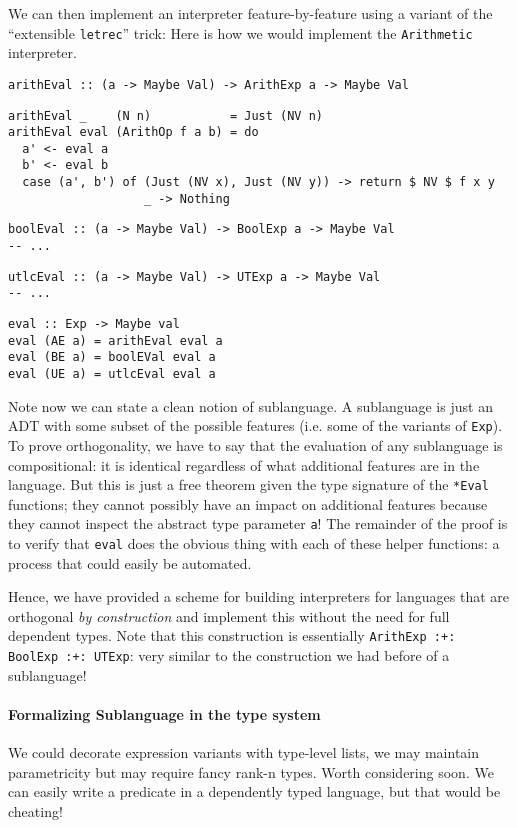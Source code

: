 \documentclass[12pt]{article}
\begin{document}
We can then implement an interpreter feature-by-feature using a variant of the ``extensible
\verb|letrec|'' trick: Here is how we would implement the \texttt{Arithmetic} interpreter.

\begin{verbatim}
arithEval :: (a -> Maybe Val) -> ArithExp a -> Maybe Val
\end{verbatim}
\begin{verbatim}
arithEval _    (N n)           = Just (NV n)
arithEval eval (ArithOp f a b) = do 
  a' <- eval a
  b' <- eval b
  case (a', b') of (Just (NV x), Just (NV y)) -> return $ NV $ f x y
                   _ -> Nothing
\end{verbatim}
\begin{verbatim}
boolEval :: (a -> Maybe Val) -> BoolExp a -> Maybe Val
-- ...
\end{verbatim}
\begin{verbatim}
utlcEval :: (a -> Maybe Val) -> UTExp a -> Maybe Val
-- ...
\end{verbatim}
\begin{verbatim}
eval :: Exp -> Maybe val
eval (AE a) = arithEval eval a
eval (BE a) = boolEVal eval a
eval (UE a) = utlcEval eval a
\end{verbatim}

Note now we can state a clean notion of sublanguage. A sublanguage is just an
ADT with some subset of the possible features (i.e. some of the variants of
\texttt{Exp}). To prove orthogonality, we have to say that the evaluation of any
sublanguage is compositional: it is identical regardless of what additional
features are in the language. But this is just a free theorem given the type
signature of the \texttt{*Eval} functions; they cannot possibly have an impact
on additional features because they cannot inspect the abstract type parameter
\texttt{a}! The remainder of the proof is to verify that \texttt{eval} does the
obvious thing with each of these helper functions: a process that could easily
be automated.

Hence, we have provided a scheme for building interpreters for languages that
are orthogonal \emph{by construction} and implement this without the need for
full dependent types. Note that this construction is essentially 
\texttt{ArithExp :+: BoolExp :+: UTExp}: very similar to the construction we had
before of a sublanguage!

\paragraph{Formalizing Sublanguage in the type system} We could decorate
expression variants with type-level lists, we may maintain parametricity but may
require fancy rank-n types. Worth considering soon. We can easily write a
predicate in a dependently typed language, but that would be cheating!
\end{document}
